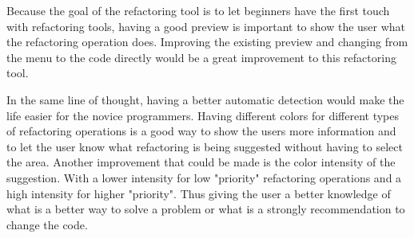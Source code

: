 Because the goal of the refactoring tool is to let beginners have the first touch
with refactoring tools, having a good preview is important to show the user what
the refactoring operation does.
Improving the existing preview and changing from the menu to the code directly
would be a great improvement to this refactoring tool.


In the same line of thought, having a better automatic detection would make the
life easier for the novice programmers. Having different colors for different
types of refactoring operations is a good way to show the users more information
and to let the user know what refactoring is being suggested without having to
select the area.
Another improvement that could be made is the color intensity of the suggestion.
With a lower intensity for low "priority" refactoring operations and a high intensity
for higher "priority". Thus giving the user a better knowledge of what is a better
way to solve a problem or what is a strongly recommendation to change the code.
